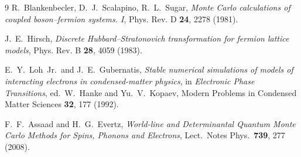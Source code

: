 \documentclass[11pt,a4paper]{article}
\theoremstyle{plain}
\begin{document}
\begin{thebibliography}{9}
R.~Blankenbecler, D.~J.~Scalapino, R.~L.~Sugar,
\emph{Monte Carlo calculations of coupled boson--fermion systems. I},
Phys. Rev. D \textbf{24}, 2278 (1981).

J.~E.~Hirsch,
\emph{Discrete Hubbard--Stratonovich transformation for fermion lattice models},
Phys. Rev. B \textbf{28}, 4059 (1983).

E.~Y.~Loh~Jr.\ and J.~E.~Gubernatis,
\emph{Stable numerical simulations of models of interacting electrons in
condensed-matter physics}, in
\emph{Electronic Phase Transitions}, ed.\ W.~Hanke and Yu.~V.~Kopaev,
Modern Problems in Condensed Matter Sciences \textbf{32}, 177 (1992).

F.~F.~Assaad and H.~G.~Evertz,
\emph{World-line and Determinantal Quantum Monte Carlo Methods for
Spins, Phonons and Electrons},
Lect.\ Notes Phys.\ \textbf{739}, 277 (2008).
\end{thebibliography}
\end{document}
